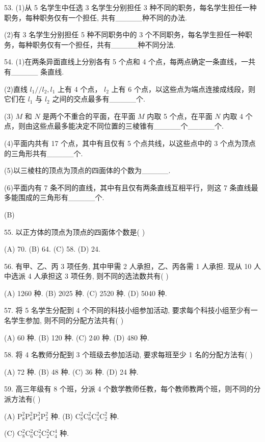 \documentclass[10pt]{article}
\begin{document}
53. (1)从 5 名学生中任选 3 名学生分别担任 3 种不同的职务，每名学生担任一种职务，每种职务仅有一个担任, 共有\_\_\_\_\_种不同的办法.

(2)有 3 名学生分别担任 5 种不同职务中的 3 个不同职务，每名学生担任一种职务，每种职务仅有一个担任，共有\_\_\_\_\_种不同分法.

54. (1)在两条异面直线上分别各有 5 个点和 4 个点，每两点确定一条直线，一共有\_\_\_\_\_ 条直线.

(2)直线 \({l}_{1}//{l}_{2},{l}_{1}\) 上有 4 个点， \({l}_{2}\) 上有 6 个点，以这些点为端点连接成线段，则它们在 \({l}_{1}\) 与 \({l}_{2}\) 之间的交点最多有\_\_\_\_\_个.

(3) \(M\) 和 \(N\) 是两个不重合的平面，在平面 \(M\) 内取 5 个点，在平面 \(N\) 内取 4 个点，则由这些点最多能决定不同位置的三棱锥有\_\_\_\_\_个\_\_\_\_\_个.

(4)平面内共有 17 个点，其中有且仅有 5 个点共线，以这些点中的 3 个点为顶点的三角形共有\_\_\_\_\_个.

(5)以三棱柱的顶点为顶点的四面体的个数为\_\_\_\_\_.

(6)平面内有 7 条不同的直线，其中有且仅有两条直线互相平行，则这 7 条直线最多能围成的三角形有\_\_\_\_\_个.

(B)

55. 以正方体的顶点为顶点的四面体个数是( )

(A) 70. (B) 64. (C) 58. (D) 24.

56. 有甲、乙、丙 3 项任务, 其中甲需 2 人承担，乙、丙各需 1 人承担. 现从 10 人中选派 4 人承担这 3 项任务, 则不同的选法数共有( )

(A) 1260 种. (B) 2025 种. (C) 2520 种. (D) 5040 种.

57. 将 5 名学生分配到 4 个不同的科技小组参加活动, 要求每个科技小组至少有一名学生参加, 则不同的分配方法共有( )

(A) 60 种. (B) 120 种. (C) 240 种. (D) 480 种.

58. 将 4 名教师分配到 3 个班级去参加活动, 要求每班至少 1 名的分配方法有( )

(A) 72 种. (B) 48 种. (C) 36 种. (D) 24 种.

59. 高三年级有 8 个班，分派 4 个数学教师任教，每个教师教两个班，则不同的分派方法有( )

(A) \({\mathrm{P}}_{8}^{2}{\mathrm{P}}_{6}^{2}{\mathrm{P}}_{4}^{2}{\mathrm{P}}_{2}^{2}\) 种. (B) \({\mathrm{C}}_{8}^{2}{\mathrm{C}}_{6}^{2}{\mathrm{C}}_{4}^{2}{\mathrm{C}}_{2}^{2}\) 种.

(C) \({\mathrm{C}}_{8}^{2}{\mathrm{C}}_{6}^{2}{\mathrm{C}}_{4}^{2}{\mathrm{C}}_{2}^{2}{\mathrm{C}}_{4}^{4}\) 种.
\end{document}
